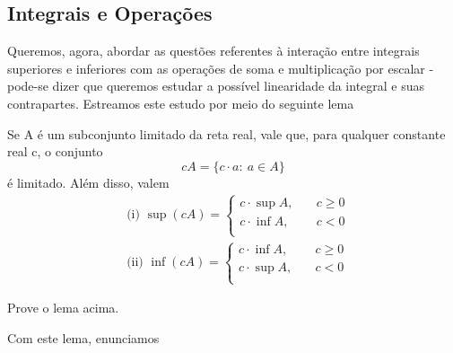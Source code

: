 \documentclass[../analysisII_notes.tex]{subfiles}
\begin{document}
\subsection{Integrais e Operações}
Queremos, agora, abordar as questões referentes à interação entre integrais superiores e inferiores com as operações de soma e multiplicação por escalar - pode-se dizer que queremos estudar a possível linearidade da integral e suas contrapartes. Estreamos este estudo por meio do seguinte lema
\begin{lemma*}
	Se A é um subconjunto limitado da reta real, vale que, para qualquer constante real c, o conjunto
	\[
		cA=\{c \cdot a:\: a\in A\}
	\]
	é limitado. Além disso, valem
	\begin{align*}
		 & \text{(i) }\sup_{}(cA)  = \left\{\begin{array}{ll}
			                                    c \cdot \sup_{}A, & \quad c\geq 0 \\
			                                    c \cdot \inf_{}A, & \quad c < 0   \\
		                                    \end{array}\right.                 \\
		 & \text{(ii) }\inf_{}(cA)  = \left\{\begin{array}{ll}
			                                     c \cdot \inf_{}A,                & \quad c\geq 0 \\
			                                     c \cdot \sup_{}A               , & \quad c < 0   \\
		                                     \end{array}\right.
	\end{align*}
\end{lemma*}
\begin{exr}
	Prove o lema acima.
\end{exr}
Com este lema, enunciamos
\end{document}
